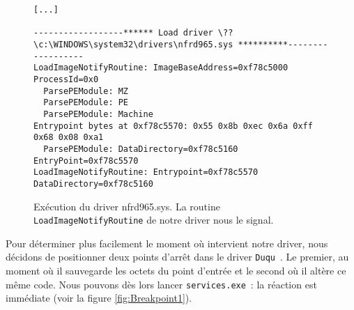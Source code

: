 \documentclass[times,11pt,fullpage]{article}
\newcommand{\Duqu}{\texttt{Duqu}}
\newcommand{\service}{\texttt{services.exe}}
\begin{document}
\begin{figure}
\begin{verbatim}
[...]

------------------****** Load driver \??\c:\WINDOWS\system32\drivers\nfrd965.sys **********------------------
LoadImageNotifyRoutine: ImageBaseAddress=0xf78c5000 ProcessId=0x0 
  ParsePEModule: MZ
  ParsePEModule: PE
  ParsePEModule: Machine
Entrypoint bytes at 0xf78c5570: 0x55 0x8b 0xec 0x6a 0xff 0x68 0x08 0xa1
  ParsePEModule: DataDirectory=0xf78c5160 EntryPoint=0xf78c5570
LoadImageNotifyRoutine: Entrypoint=0xf78c5570 DataDirectory=0xf78c5160 
\end{verbatim}
\caption{Exécution du driver nfrd965.sys. La routine \texttt{LoadImageNotifyRoutine} de notre driver nous le signal.\label{fig:LaunchNFRD965}}
\end{figure}

Pour déterminer plus facilement le moment où intervient notre driver, nous décidons de positionner deux points d'arrêt dans le driver \Duqu\ . Le premier, au moment où il sauvegarde les octets du point d'entrée et le second où il altère ce même code. Nous pouvons dès lors lancer \service\ : la réaction est immédiate (voir la figure \ref{fig:Breakpoint1}).  
\end{document}
